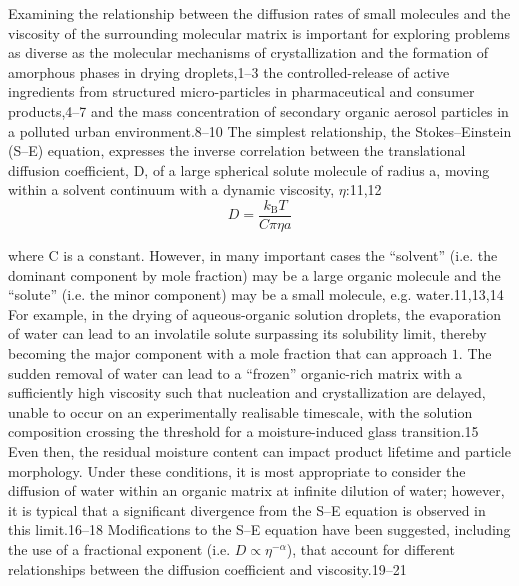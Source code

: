 Examining the relationship between the diffusion rates of small molecules and the viscosity of the surrounding molecular matrix is important for exploring problems as diverse as the molecular mechanisms of crystallization and the formation of amorphous phases in drying droplets,1–3 the controlled-release of active ingredients from structured micro-particles in pharmaceutical and consumer products,4–7 and the mass concentration of secondary organic aerosol particles in a polluted urban environment.8–10 The simplest relationship, the Stokes–Einstein (S–E) equation, expresses the inverse correlation between the translational diffusion coefficient, D, of a large spherical solute molecule of radius a, moving within a solvent continuum with a dynamic viscosity, $\eta$:11,12
\begin{equation}\label{eqn:diffusion}
D=\frac{k_{\mathrm{B}} T}{C \pi \eta a}
\end{equation}

where C is a constant. However, in many important cases the ``solvent” (i.e. the dominant component by mole fraction) may be a large organic molecule and the ``solute” (i.e. the minor component) may be a small molecule, e.g. water.11,13,14 For example, in the drying of aqueous-organic solution droplets, the evaporation of water can lead to an involatile solute surpassing its solubility limit, thereby becoming the major component with a mole fraction that can approach $1$. The sudden removal of water can lead to a “frozen” organic-rich matrix with a sufficiently high viscosity such that nucleation and crystallization are delayed, unable to occur on an experimentally realisable timescale, with the solution composition crossing the threshold for a moisture-induced glass transition.15 Even then, the residual moisture content can impact product lifetime and particle morphology. Under these conditions, it is most appropriate to consider the diffusion of water within an organic matrix at infinite dilution of water; however, it is typical that a significant divergence from the S–E equation is observed in this limit.16–18 Modifications to the S–E equation have been suggested, including the use of a fractional exponent (i.e. $D \propto \eta^{-\alpha}$), that account for different relationships between the diffusion coefficient and viscosity.19–21

